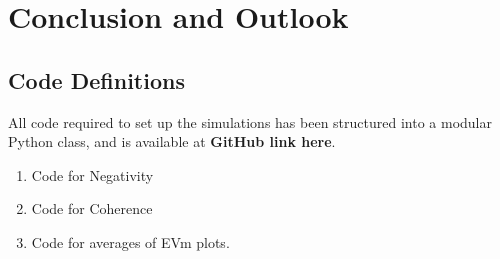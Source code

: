 \documentclass[11pt]{article}
\begin{document}
\newpage
\section{Conclusion and Outlook} \label{sec:conc}











































\begin{appendices}
    \section{Code Definitions} \label{appendix_code}
 All code required to set up the simulations has been structured into a modular Python class, and is available at \textbf{GitHub link here}. 

 \begin{enumerate}
     \item Code for Negativity
     \item Code for Coherence
     \item Code for averages of EVm plots. 
 \end{enumerate}
\end{appendices}
\newpage

 
 
\end{document}
